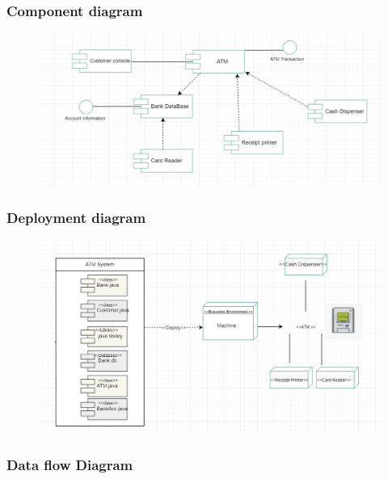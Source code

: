 \documentclass{article}
\begin{document}
	\newpage\subsubsection{Component diagram}
		\begin{figure}[h!]
			\begin{center}
				\includegraphics[width=\linewidth]{img/component.png}
			\end{center}
		\end{figure}
	\newpage\subsubsection{Deployment diagram}
		\begin{figure}[h!]
			\begin{center}
				\includegraphics[width=\linewidth]{img/deployment.png}
			\end{center}
		\end{figure}
	\newpage\subsubsection{Data flow Diagram}	
\end{document}
